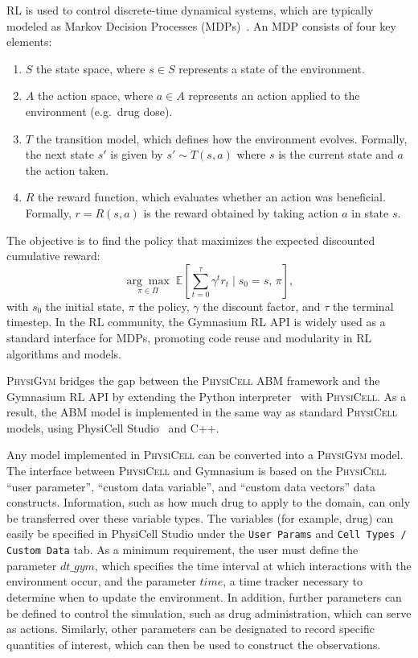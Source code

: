\documentclass{article}
\newcommand{\physigym}{\textsc{PhysiGym}}
\newcommand{\physicell}{\textsc{PhysiCell}}
\begin{document}
RL is used to control discrete-time dynamical systems, which are typically
modeled as Markov Decision Processes
(MDPs)~\citep{bellman1957markovian, puterman2014markov}.
An MDP consists of four key elements:
\begin{enumerate}
    \item $S$ the state space, where $s\in S$ represents a state of the environment.
    \item $A$ the action space, where $a \in A$ represents an action applied to the environment (e.g.\ drug dose).
    \item $T$ the transition model, which defines how the environment evolves. Formally, the next state $s'$ is given by $s'\sim T(s,a)$ where $s$ is the current state and $a$ the action taken.
    \item $R$ the reward function, which evaluates whether an action was beneficial. Formally, $r = R(s,a)$ is the reward obtained by taking action $a$ in state $s$.
\end{enumerate}
The objective is to find the policy that maximizes the expected discounted
cumulative reward:
\[
  \underset{\pi\in\Pi}{\arg\max}\;
  \mathbb{E}\!\left[\sum_{t=0}^{\tau}\gamma^t r_t \mid s_0 = s,\,\pi\right],
\]
with $s_0$ the initial state, $\pi$ the policy, $\gamma$ the discount factor,
and $\tau$ the terminal timestep. In the RL community, the Gymnasium RL API is
widely used as a standard interface for MDPs, promoting code reuse and
modularity in RL algorithms and models.

\physigym{} bridges the gap between the \physicell{} ABM framework and the
Gymnasium RL API by extending the Python
interpreter~\citep{rossum1995extending, psf2024extending} with \physicell{}.
As a result, the ABM model is implemented in the same way as standard
\physicell{} models, using PhysiCell Studio~\citep{heiland2024physicellstudio}
and C++.

Any model implemented in \physicell{} can be converted into a \physigym{} model.
The interface between \physicell{} and Gymnasium is based on the \physicell{}
``user parameter'', ``custom data variable'', and ``custom data vectors'' data
constructs. Information, such as how much drug to apply to the domain, can only
be transferred over these variable types. The variables (for example, drug) can
easily be specified in PhysiCell Studio under the \texttt{User Params} and
\texttt{Cell Types / Custom Data} tab.
As a minimum requirement, the user must define the parameter $dt\_gym$, which
specifies the time interval at which interactions with the environment occur,
and the parameter $time$, a time tracker necessary to determine when to update
the environment. In addition, further parameters can be defined to control the
simulation, such as drug administration, which can serve as actions. Similarly,
other parameters can be designated to record specific quantities of interest,
which can then be used to construct the observations.
\end{document}
